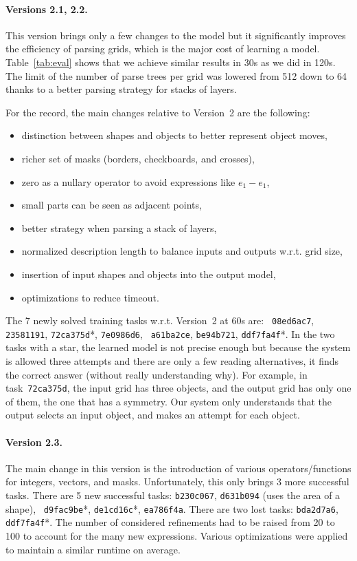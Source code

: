 \documentclass[a4paper]{llncs}
\begin{document}
\paragraph{Versions 2.1, 2.2.} This version brings only a few changes to the
model but it significantly improves the efficiency of parsing grids,
which is the major cost of learning a model. Table~\ref{tab:eval}
shows that we achieve similar results in 30s as we did in 120s. The
limit of the number of parse trees per grid was lowered from 512 down
to 64 thanks to a better parsing strategy for stacks of layers.

For the record, the main changes relative to Version~2 are the following:
\begin{itemize}
\item distinction between shapes and objects to better represent object moves,
\item richer set of masks (borders, checkboards, and crosses),
\item zero as a nullary operator to avoid expressions like $e_1 - e_1$,
\item small parts can be seen as adjacent points,
\item better strategy when parsing a stack of layers,
\item normalized description length to balance inputs and outputs w.r.t. grid size,
\item insertion of input shapes and objects into the output model,
\item optimizations to reduce timeout.
\end{itemize}

The 7 newly solved training tasks w.r.t. Version~2 at 60s are: {\tt
  08ed6ac7}, {\tt 23581191}, {\tt 72ca375d}*, {\tt 7e0986d6}, {\tt
  a61ba2ce}, {\tt be94b721}, {\tt ddf7fa4f}*. In the two tasks with a
star, the learned model is not precise enough but because the system
is allowed three attempts and there are only a few reading
alternatives, it finds the correct answer (without really
understanding why). For example, in task~{\tt 72ca375d}, the input
grid has three objects, and the output grid has only one of them, the
one that has a symmetry. Our system only understands that the output
selects an input object, and makes an attempt for each object.

\paragraph{Version 2.3.} The main change in this version is the
introduction of various operators/functions for integers, vectors, and
masks. Unfortunately, this only brings 3 more successful tasks. There
are 5 new successful tasks: {\tt b230c067}, {\tt d631b094} (uses the area of a shape), {\tt
  d9fac9be}*, {\tt de1cd16c}*, {\tt ea786f4a}. There are two lost
tasks: {\tt bda2d7a6}, {\tt ddf7fa4f}*.
%
The number of considered refinements had to be raised from 20 to 100
to account for the many new expressions. Various optimizations were
applied to maintain a similar runtime on average.
\end{document}
